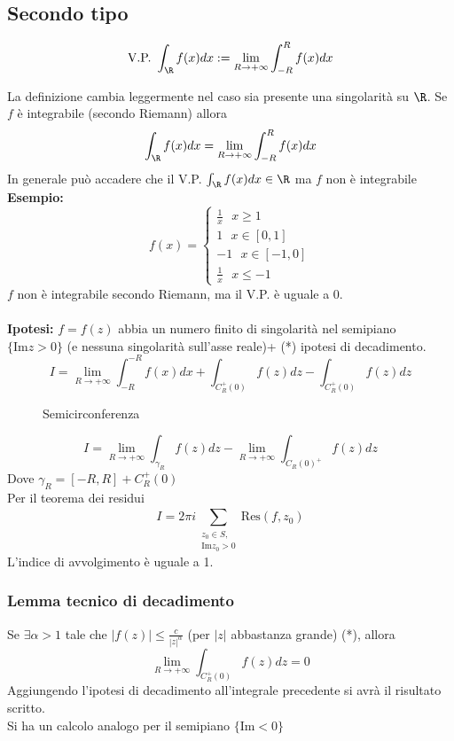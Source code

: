 \subsection{Secondo tipo}
\begin{tcolorbox}	
	\[\text{V.P.  }\int_{\R}^{} f(x)dx:= \lim_{R \to +\infty} \int_{-R}^{R} f(x)dx \] 
\end{tcolorbox}
La definizione cambia leggermente nel caso sia presente una singolarità su $\R$.
Se $f$ è integrabile (secondo Riemann) allora 
\[\int_{\R}^{} f(x)dx=\lim_{R \to +\infty} \int_{-R}^{R} f(x)dx\]
In generale può accadere che il V.P. $\int_{\R}^{} f(x)dx \in\R$ ma $f$ non è integrabile
\textbf{Esempio:} 
\[f(x)=\begin{cases}
	\frac{1}{x}\ \ \ x\ge 1\\
	1\ \ \ x\in[0,1]\\
	-1\ \ \ x\in[-1,0]\\
	\frac{1}{x}\ \ \ x\le -1
\end{cases}
\]
$f$ non è integrabile secondo Riemann, ma il V.P. è uguale a 0.\\\divider
\\\textbf{Ipotesi: }$f=f(z)$ abbia un numero finito di singolarità nel semipiano $\{\text{Im}z>0\} $ (e nessuna singolarità sull'asse reale)+ (*) ipotesi di decadimento.
\[I=\lim_{R \to +\infty} \int_{-R}^{-R} f(x)dx+\int_{C_R^+(0)}^{} f(z)dz-\int_{C_R^+(0)}^{} f(z)dz \]
\begin{figure}[ht]
    \centering
    \caption{Semicirconferenza}
    \label{fig:semicirconferenza}
\end{figure}
\[I=\lim_{R \to +\infty} \int_{\gamma_R}{f(z)dz} -\lim_{R \to +\infty} \int_{C_R(0)^+}^{} f(z)dz\]
Dove $\gamma_R=[-R,R]+C_R^+(0)$
\\Per il teorema dei residui
\[I=2\pi i \sum_{\substack{z_0\in S,\\  \text{Im}z_0>0}}^{} \text{Res}(f,z_0)\]
L'indice di avvolgimento è uguale a 1.
\subsubsection{Lemma tecnico di decadimento}
Se $\exists \alpha >1$ tale che $|f(z)|\le \frac{c}{|z|^\alpha}$ (per $|z|$ abbastanza grande) (*), allora
\[\lim_{R \to +\infty} \int_{C_R^+(0)}^{} f(z)dz=0\]
Aggiungendo l'ipotesi di decadimento all'integrale precedente si avrà il risultato scritto.
\\Si ha un calcolo analogo per il semipiano $\{\text{Im}<0\} $
